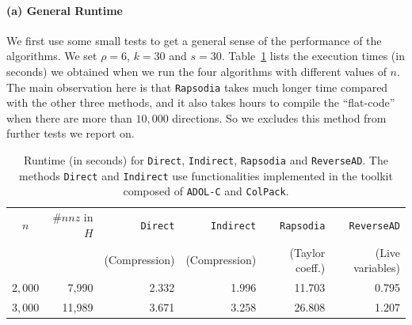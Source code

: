\documentclass[11pt, a4paper, english]{article}
\begin{document}
\paragraph{(a) General Runtime} 
We first use some small tests to get a general sense of the performance of the algorithms. We set $\rho = 6$, $k = 30$ and $s = 30$. 
Table~\ref{tab:general} lists the execution times (in seconds) we obtained when
we run the four algorithms with different values of $n$.  The main observation here is that
{\tt Rapsodia} takes much longer time compared with the other three methods, and it also takes hours to compile the ``flat-code'' when there are more than $10,000$ directions. 
So we excludes this method from further tests we report on.
\begin{table}[htbp]
\begin{center}
\begin{tabular}{ | c | r | r | r | r | r |}
\hline
$n$ & $\#nnz$ in $H$ & {\tt Direct} & {\tt Indirect} & {\tt Rapsodia} & {\tt ReverseAD} \\
       &                          & (Compression) & (Compression) & (Taylor coeff.) & (Live variables) \\ 
\hline
$2,000$ & 7,990 & 2.332 & 1.996 & 11.703 & 0.795 \\
$3,000$ & 11,989 & 3.671 & 3.258 & 26.808 & 1.207\\
\hline 
\end{tabular}
\end{center}
\caption{Runtime (in seconds) for {\tt Direct}, {\tt Indirect}, {\tt Rapsodia} and {\tt ReverseAD}. The methods {\tt Direct} and {\tt Indirect} use functionalities implemented in the toolkit composed of {\tt ADOL-C} and {\tt ColPack}.} 
\label{tab:general}
\end{table}
\end{document}
